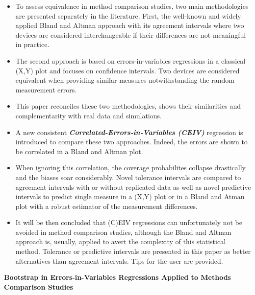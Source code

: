 \begin{itemize}
	\item To assess equivalence in method comparison studies, two main methodologies are presented separately in the literature. First, the well-known and widely applied Bland and Altman approach with its agreement intervals where two devices are considered interchangeable if their differences are not meaningful in practice. 
	\item The second approach is based on errors-in-variables regressions in a classical (X,Y) plot and focuses on confidence intervals. Two devices are considered equivalent when providing similar measures notwithstanding the random measurement errors. \item This paper reconciles these two methodologies, shows their similarities and complementarity with real data and simulations. 
	\item A new consistent \textbf{\textit{Correlated-Errors-in-Variables (CEIV)}} regression is introduced to compare these two approaches. Indeed, the errors are shown to be correlated in a Bland and Altman plot.
	\item  When ignoring this correlation, the coverage probabilites collapse drastically and the biases soar considerably. Novel tolerance intervals are compared to agreement intervals with or without replicated data as well as novel predictive intervals to predict single measure in a (X,Y) plot or in a Bland and Atman plot with a robust estimator of the measurement differences. \item It will be then concluded that (C)EIV regressions can unfortunately not be avoided in method comparison studies, although the Bland and Altman approach is, usually, applied to avert the complexity of this statistical method. Tolerance or predictive intervals are presented in this paper as better alternatives than agreement intervals. Tips for the user are provided.
\end{itemize}

\newpage

\textbf{Bootstrap in Errors-in-Variables Regressions Applied to Methods Comparison Studies}

